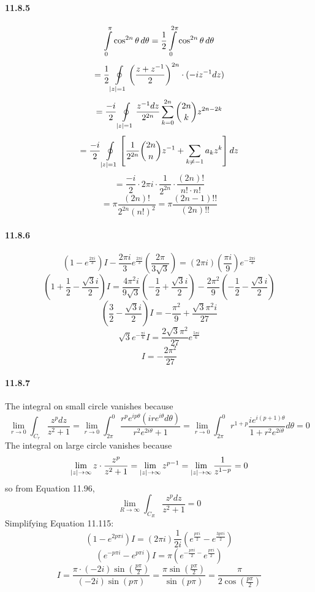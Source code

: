 \documentclass[a4paper]{article}
\begin{document}
\paragraph{11.8.5}
\[
\int\displaylimits_0^\pi\cos^{2n}\theta\,d\theta=\frac{1}{2}\int\displaylimits_0^{2\pi}\cos^{2n}\theta\,d\theta
\]
\[
=\frac{1}{2}\oint\displaylimits_{|z|=1}\left(\frac{z+z^{-1}}{2} \right)^{2n}\cdot(-iz^{-1}dz)
\]
\[
=\frac{-i}{2}\oint\displaylimits_{|z|=1}\frac{z^{-1}dz}{2^{2n}}\sum_{k=0}^{2n}\binom{2n}{k}z^{2n-2k}
\]
\[
=\frac{-i}{2}\oint\displaylimits_{|z|=1}\left[\frac{1}{2^{2n}}\binom{2n}{n}z^{-1}+\sum_{k\neq-1}a_kz^k \right]dz
\]
\[
=\frac{-i}{2}\cdot2\pi i\cdot\frac{1}{2^{2n}}\cdot\frac{(2n)!}{n!\cdot n!}
\]
\[
=\pi\frac{(2n)!}{2^{2n}(n!)^2}=\pi\frac{(2n-1)!!}{(2n)!!}
\]

\paragraph{11.8.6}
\[
\left(1-e^{\frac{2\pi i}{3}}\right)I-\frac{2\pi i}{3}e^{\frac{2\pi i}{3}}\left(\frac{2\pi}{3\sqrt{3}}\right)=(2\pi i)\left(\frac{\pi i}{9}\right)e^{-\frac{2\pi i}{3}}
\]
\[
\left(1+\frac{1}{2}-\frac{\sqrt{3}i}{2}\right)I=\frac{4\pi^2i}{9\sqrt{3}}\left(-\frac{1}{2}+\frac{\sqrt{3}i}{2}\right)-\frac{2\pi^2}{9}\left(-\frac{1}{2}-\frac{\sqrt{3}i}{2}\right)
\]
\[
\left(\frac{3}{2}-\frac{\sqrt{3}i}{2}\right)I=-\frac{\pi^2}{9}+\frac{\sqrt{3}\pi^2i}{27}
\]
\[
\sqrt{3}e^{-\frac{\pi i}{6}}I=\frac{2\sqrt{3}\pi^2}{27}e^{\frac{5\pi i}{6}}
\]
\[
I=-\frac{2\pi^2}{27}
\]

\paragraph{11.8.7}
The integral on small circle vanishes because
\[
\lim_{r\to0}\int_{C_r}\frac{z^pdz}{z^2+1}=
\lim_{r\to0}\int_{2\pi}^0\frac{r^pe^{ip\theta}(ire^{i\theta }d\theta)}{r^2e^{2i\theta}+1}=\lim_{r\to0}\int_{2\pi}^0 r^{1+p}\frac{ie^{i(p+1)\theta}}{1+r^2e^{2i\theta}}d\theta=0
\]
The integral on large circle vanishes because
\[
\lim\displaylimits_{|z|\to\infty}z\cdot\frac{z^p}{z^2+1}=\lim_{|z|\to\infty }z^{p-1}=\lim_{|z|\to\infty}\frac{1}{z^{1-p}}=0
\]
so from Equation 11.96,
\[
\lim_{R\to\infty}\int_{C_R}\frac{z^pdz}{z^2+1}=0
\]
Simplifying Equation 11.115:
\[
\left(1-e^{2p\pi i}\right)I=(2\pi i)\frac{1}{2i}\left(e^{\frac{p\pi i}{2}}-e^{\frac{3p\pi i}{2}} \right)
\]
\[
\left(e^{-p\pi i}-e^{p\pi i} \right)I=\pi\left(e^{-\frac{p\pi i}{2}-}e^{\frac{p\pi i}{2}} \right)
\]
\[
I=\frac{\pi\cdot(-2i)\sin(\frac{p\pi}{2})}{(-2i)\sin(p\pi)}=\frac{\pi\sin(\frac{p\pi}{2})}{\sin(p\pi)}=\frac{\pi}{2\cos(\frac{p\pi}{2})}
\]
\end{document}
